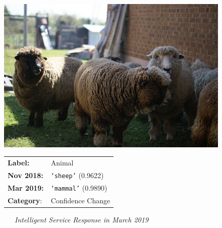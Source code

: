 

\begin{figure}
    \begin{framed}
    \centering
    \begin{minipage}{\linewidth}
        \begin{shaded*}
            \begin{minipage}{0.3\linewidth}
            \includegraphics[width=\linewidth]{000000005992}
            \end{minipage}
            \hfill
            \begin{minipage}{0.65\linewidth}
                \begin{tabular}{ll}
                \textbf{Label:}&Animal\\
                \textbf{Nov 2018:}&\texttt{`sheep'} (0.9622)\\
                \textbf{Mar 2019:}&\texttt{`mammal'} (0.9890)\\
                \textbf{Category}:&Confidence Change
                \end{tabular}
            \end{minipage}
            \hfill
        \end{shaded*}
    \end{minipage}
    \begin{minipage}{\linewidth}
        \centering\bigskip
        \noindent\xrfill[0.45ex]{.5pt}~~~\textit{Intelligent Service Response in March 2019}~~~\xrfill[0.45ex]{.5pt}
        \begin{lstlisting}[language=json]

\end{lstlisting}
\end{minipage}
\end{framed}
\end{figure}
